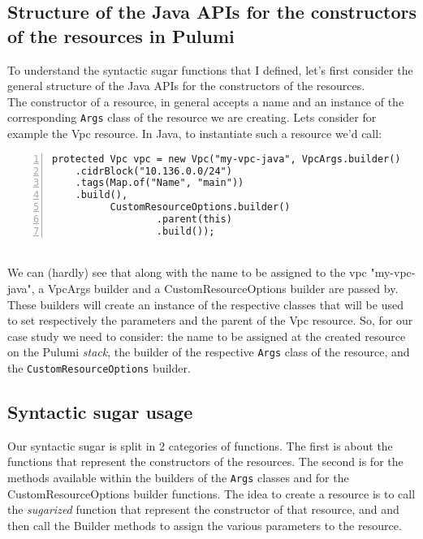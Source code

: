 \subsection{Structure of the Java APIs for the constructors of the resources in Pulumi}
To understand the syntactic sugar functions that I defined, let's first consider the general structure of the Java APIs for the constructors of the resources.\\
The constructor of a resource, in general accepts a name and an instance of the corresponding \texttt{Args} class of the resource we are creating.
Lets consider for example the Vpc resource.
In Java, to instantiate such a resource we'd call:
\begin{lstlisting}[numbers=left, numberstyle=\tiny, numbersep=-5pt, stepnumber=1]
  protected Vpc vpc = new Vpc("my-vpc-java", VpcArgs.builder()
    .cidrBlock("10.136.0.0/24")
    .tags(Map.of("Name", "main"))
    .build(),
          CustomResourceOptions.builder()
                  .parent(this)
                  .build());
\end{lstlisting}\mbox{}\\
We can (hardly) see that along with the name to be assigned to the vpc "my-vpc-java", a VpcArgs builder and a CustomResourceOptions builder are passed by.
These builders will create an instance of the respective classes that will be used to set respectively the parameters and the parent of the Vpc resource.
So, for our case study we need to consider: the name to be assigned at the created resource on the Pulumi \textit{stack}, the builder of the respective \texttt{Args} class of the resource, and the \texttt{CustomResourceOptions} builder.


\subsection{Syntactic sugar usage}
\label{ssec:syn-sug-usage}
Our syntactic sugar is split in 2 categories of functions.
The first is about the functions that represent the constructors of the resources.
The second is for the methods available within the builders of the \texttt{Args} classes and for the CustomResourceOptions builder functions.
The idea to create a resource is to call the \textit{sugarized} function that represent the constructor of that resource, and and then call the Builder methods to assign the various parameters to the resource.

